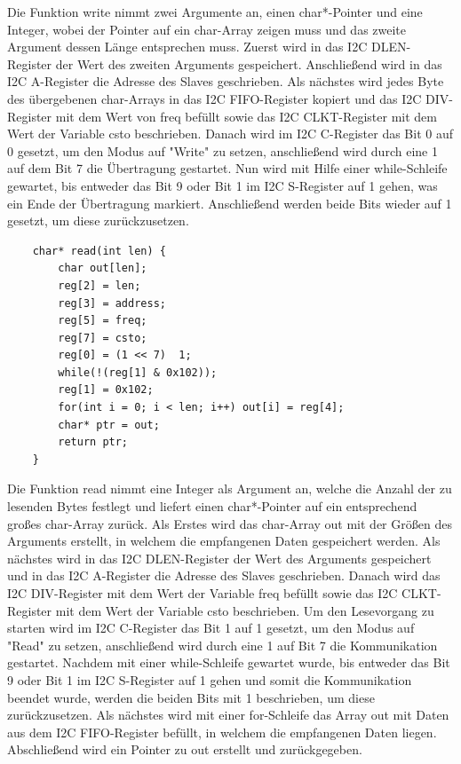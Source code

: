\documentclass[12pt]{article}
\begin{document}
Die Funktion write nimmt zwei Argumente an, einen char*-Pointer und eine Integer, wobei der Pointer auf ein char-Array zeigen muss und das zweite Argument dessen Länge entsprechen muss. Zuerst wird in das I2C DLEN-Register der Wert des zweiten Arguments gespeichert. Anschließend wird in das I2C A-Register die Adresse des Slaves geschrieben. Als nächstes wird jedes Byte des übergebenen char-Arrays in das I2C FIFO-Register kopiert und das I2C DIV-Register mit dem Wert von freq befüllt sowie das I2C CLKT-Register mit dem Wert der Variable csto beschrieben. Danach wird im I2C C-Register das Bit 0 auf 0 gesetzt, um den Modus auf "Write" zu setzen, anschließend wird durch eine 1 auf dem Bit 7 die Übertragung gestartet. Nun wird mit Hilfe einer while-Schleife gewartet, bis entweder das Bit 9 oder Bit 1 im I2C S-Register auf 1 gehen, was ein Ende der Übertragung markiert. Anschließend werden beide Bits wieder auf 1 gesetzt, um diese zurückzusetzen.\\
\begin{verbatim}
    char* read(int len) {
        char out[len];
        reg[2] = len;
        reg[3] = address;
        reg[5] = freq;
        reg[7] = csto;
        reg[0] = (1 << 7)  1;
        while(!(reg[1] & 0x102));
        reg[1] = 0x102;
        for(int i = 0; i < len; i++) out[i] = reg[4];
        char* ptr = out;
        return ptr;
    }
\end{verbatim}
Die Funktion read nimmt eine Integer als Argument an, welche die Anzahl der zu lesenden Bytes festlegt und liefert einen char*-Pointer auf ein entsprechend großes char-Array zurück. Als Erstes wird das char-Array out mit der Größen des Arguments erstellt, in welchem die empfangenen Daten gespeichert werden. Als nächstes wird in das I2C DLEN-Register der Wert des Arguments gespeichert und in das I2C A-Register die Adresse des Slaves geschrieben. Danach wird das I2C DIV-Register mit dem Wert der Variable freq befüllt sowie das I2C CLKT-Register mit dem Wert der Variable csto beschrieben. Um den Lesevorgang zu starten wird im I2C C-Register das Bit 1 auf 1 gesetzt, um den Modus auf "Read" zu setzen, anschließend wird durch eine 1 auf Bit 7 die Kommunikation gestartet. Nachdem mit einer while-Schleife gewartet wurde, bis entweder das Bit 9 oder Bit 1 im I2C S-Register auf 1 gehen und somit die Kommunikation beendet wurde, werden die beiden Bits mit 1 beschrieben, um diese zurückzusetzen. Als nächstes wird mit einer for-Schleife das Array out mit Daten aus dem I2C FIFO-Register befüllt, in welchem die empfangenen Daten liegen. Abschließend wird ein Pointer zu out erstellt und zurückgegeben.\\\\\\
\end{document}
